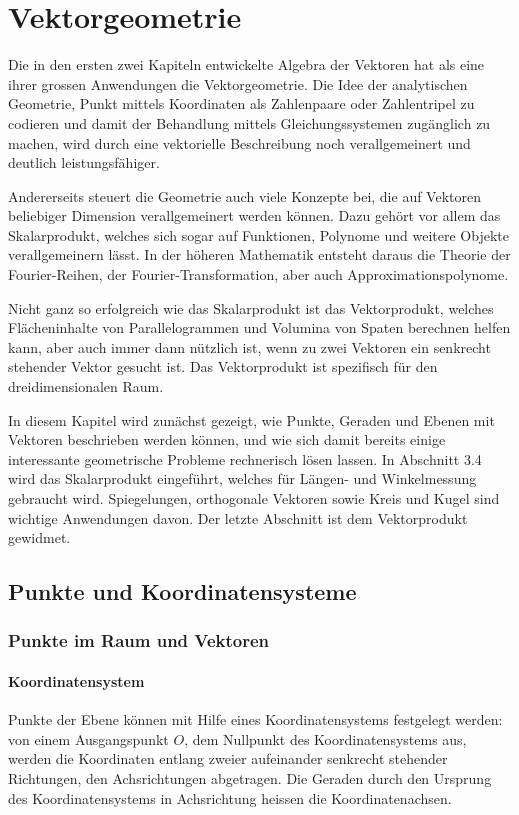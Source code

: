 \chapter{Vektorgeometrie\label{chapter-vektorgeometrie}}
Die in den ersten zwei Kapiteln entwickelte Algebra der Vektoren
hat als eine ihrer grossen Anwendungen die Vektorgeometrie.
Die
Idee der analytischen Geometrie, Punkt mittels Koordinaten als Zahlenpaare
oder Zahlentripel zu codieren und damit der Behandlung mittels
Gleichungssystemen zugänglich zu machen, wird durch eine
vektorielle Beschreibung noch verallgemeinert und deutlich leistungsfähiger.

Andererseits steuert die Geometrie auch viele Konzepte bei, die auf
Vektoren beliebiger Dimension verallgemeinert werden können.
Dazu gehört vor allem das Skalarprodukt, welches sich sogar auf
Funktionen, Polynome und weitere Objekte verallgemeinern lässt.
In der höheren Mathematik entsteht daraus die Theorie der Fourier-Reihen,
der Fourier-Transformation, aber auch Approximationspolynome.

Nicht ganz so erfolgreich wie das Skalarprodukt ist das Vektorprodukt,
welches Flächeninhalte von Parallelogrammen und Volumina von Spaten
berechnen helfen kann, aber auch immer dann nützlich ist, wenn
zu zwei Vektoren ein senkrecht stehender Vektor gesucht ist.
Das Vektorprodukt ist spezifisch für den dreidimensionalen Raum.

In diesem Kapitel wird zunächst gezeigt, wie Punkte, Geraden und
Ebenen mit Vektoren beschrieben werden können, und wie sich damit
bereits einige interessante geometrische Probleme rechnerisch lösen
lassen.
In Abschnitt 3.4 wird das Skalarprodukt eingeführt, welches
für Längen- und Winkelmessung gebraucht wird.
Spiegelungen, orthogonale
Vektoren sowie Kreis und Kugel sind wichtige Anwendungen davon.
Der letzte Abschnitt ist dem Vektorprodukt gewidmet.

\section{Punkte und Koordinatensysteme}
\subsection{Punkte im Raum und Vektoren}
\subsubsection{Koordinatensystem}
Punkte der Ebene können mit Hilfe eines Koordinatensystems festgelegt
werden: von einem Ausgangspunkt $O$, dem Nullpunkt des Koordinatensystems
aus, werden die Koordinaten entlang zweier aufeinander senkrecht stehender
Richtungen, den Achsrichtungen abgetragen.
Die Geraden durch den Ursprung
des Koordinatensystems in Achsrichtung heissen die Koordinatenachsen.

